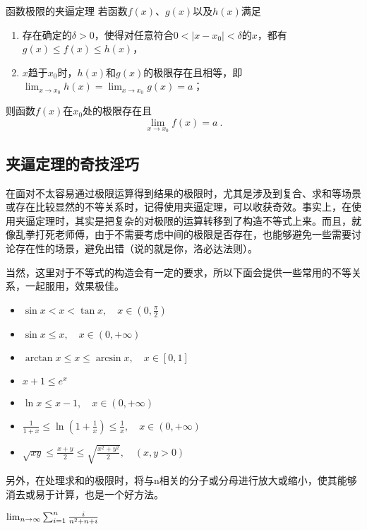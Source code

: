 \begin{theorem}{函数极限的夹逼定理}\label{the_SquzTh_2}
若函数$f(x)$、$g(x)$以及$h(x)$满足
\begin{enumerate}
\item 存在确定的$\delta>0$，使得对任意符合$0<|x-x_0|<\delta$的$x$，都有$g(x)\leq f(x)\leq h(x)$，
\item $x$趋于$x_0$时，$h(x)$和$g(x)$的极限存在且相等，即$\lim _{x\to x_0}h(x)=\lim _{x\to x_0}g(x)=a$；
\end{enumerate}
则函数$f(x)$在$x_0$处的极限存在且
\begin{equation}
\lim _{x\to x_0}f(x)=a~.
\end{equation}
\end{theorem}






\subsection{夹逼定理的奇技淫巧}

在面对不太容易通过极限运算得到结果的极限时，尤其是涉及到复合、求和等场景或存在比较显然的不等关系时，记得使用夹逼定理，可以收获奇效。事实上，在使用夹逼定理时，其实是把复杂的对极限的运算转移到了构造不等式上来。而且，就像乱拳打死老师傅，由于不需要考虑中间的极限是否存在，也能够避免一些需要讨论存在性的场景，避免出错（说的就是你，洛必达法则）。

当然，这里对于不等式的构造会有一定的要求，所以下面会提供一些常用的不等关系，一起服用，效果极佳。

\begin{itemize}
\item $\sin x < x < \tan x, \quad x \in \left(0, \frac{\pi}{2}\right)$
\item $\sin x \leq x, \quad x \in (0, +\infty)$
\item $\arctan x \leq x \leq \arcsin x, \quad x \in [0, 1] $
\item $x + 1\leq e^x$
\item $\ln x\leq x - 1 , \quad x \in (0, +\infty)$
\item $\frac{1}{1 + x} \leq \ln\left(1 + \frac{1}{x}\right) \leq \frac{1}{x}, \quad x \in (0, +\infty)$
\item $\sqrt{xy} \leq \frac{x + y}{2} \leq \sqrt{\frac{x^2 + y^2}{2}}, \quad (x, y > 0)$
\end{itemize}

\begin{example}{}

\end{example}
另外，在处理求和的极限时，将与n相关的分子或分母进行放大或缩小，使其能够消去或易于计算，也是一个好方法。
\begin{example}{$\lim_{n\to \infty}\sum_{i=1}^n{i\over n^2+n+i}$}
\end{example}



